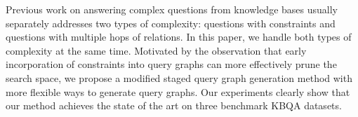 Previous work on answering complex questions from knowledge bases usually separately addresses two types of complexity: questions with constraints and questions with multiple hops of relations. In this paper, we handle both types of complexity at the same time. Motivated by the observation that early incorporation of constraints into query graphs can more effectively prune the search space, we propose a modified staged query graph generation method with more flexible ways to generate query graphs. Our experiments clearly show that our method achieves the state of the art on three benchmark KBQA datasets.
